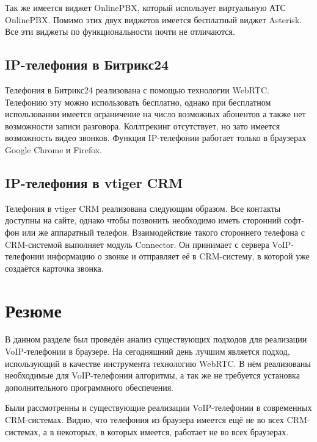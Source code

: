 Так же имеется виджет OnlinePBX, который использует виртуальную АТС OnlinePBX. Помимо этих двух виджетов имеется бесплатный виджет Asterisk. Все эти виджеты по функциональности почти не отличаются.

\subsection{IP-телефония в Битрикс24}

Телефония в Битрикс24 реализована с помощью технологии WebRTC. Телефонию эту можно использовать бесплатно, однако при бесплатном использовании имеется ограничение на число возможных абонентов а также нет возможности записи разговора. Коллтрекинг отсутствует, но зато имеется возможность видео звонков. Функция IP-телефонии работает только в браузерах Google Chrome и Firefox.\cite{bitrix24}

\subsection{IP-телефония в vtiger CRM}

Телефония в vtiger CRM реализована следующим образом. Все контакты доступны на сайте, однако чтобы позвонить необходимо иметь сторонний софт-фон или же аппаратный телефон. Взаимодействие такого стороннего телефона с CRM-системой выполняет модуль Connector. Он принимает с сервера VoIP-телефонии информацию о звонке и отправляет её в CRM-систему, в которой уже создаётся карточка звонка.

\section{Резюме}

В данном разделе был проведён анализ существующих подходов для реализации VoIP-телефонии в браузере. На сегодняшний день лучшим является подход, использующий в качестве инструмента технологию WebRTC. В нём реализованы необходимые для VoIP-телефонии алгоритмы, а так же не требуется установка дополнительного программного обеспечения.

Были рассмотренны и существующие реализации VoIP-телефонии в современных CRM-системах. Видно, что телефония из браузера имеется ещё не во всех CRM-системах, а в некоторых, в которых имеется, работает не во всех браузерах.
